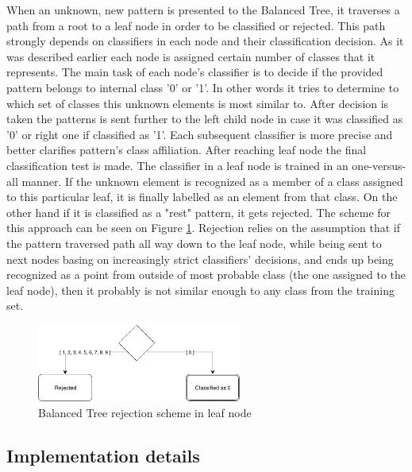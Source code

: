 When an unknown, new pattern is presented to the Balanced Tree, it traverses a path from a root to a leaf node in order to be classified or rejected. This path strongly depends on classifiers in each node and their classification decision. As it was described earlier each node is assigned certain number of classes that it represents. The main task of each node's classifier is to decide if the provided pattern belongs to internal class '0' or '1'. In other words it tries to determine to which set of classes this unknown elements is most similar to. After decision is taken the patterns is sent further to the left child node in case it was classified as '0' or right one if classified as '1'. Each subsequent classifier is more precise and better clarifies pattern's class affiliation. After reaching leaf node the final classification test is made. The classifier in a leaf node is trained in an one-versus-all manner. If the unknown element is recognized as a member of a class assigned to this particular leaf, it is finally labelled as an element from that class. On the other hand if it is classified as a "rest" pattern, it gets rejected. The scheme for this approach can be seen on Figure \ref{balanced_tree_rejection}. Rejection relies on the assumption that if the pattern traversed path all way down to the leaf node, while being sent to next nodes basing on increasingly strict classifiers' decisions, and ends up being recognized as a point from outside of most probable class (the one assigned to the leaf node), then it probably is not similar enough to any class from the training set.

\begin{figure}[htp]
	\centering
	\includegraphics[width=0.6\textwidth]{Figures/balanced_tree_rejection.jpg}
	\caption{Balanced Tree rejection scheme in leaf node}
	\label{balanced_tree_rejection}\vspace{-3pt}
\end{figure}

\subsection{Implementation details}

